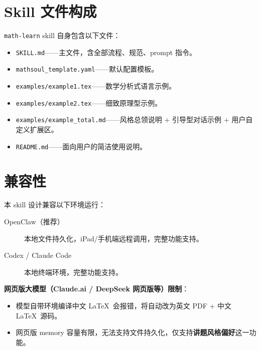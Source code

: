 \documentclass[12pt,a4paper]{ctexart}
\begin{document}
\section{Skill 文件构成}

\texttt{math-learn} skill 自身包含以下文件：
\begin{itemize}
  \item \texttt{SKILL.md}——主文件，含全部流程、规范、prompt 指令。
  \item \texttt{mathsoul\_template.yaml}——默认配置模板。
  \item \texttt{examples/example1.tex}——数学分析式语言示例。
  \item \texttt{examples/example2.tex}——细致原理型示例。
  \item \texttt{examples/example\_total.md}——风格总领说明 + 引导型对话示例 + 用户自定义扩展区。
  \item \texttt{README.md}——面向用户的简洁使用说明。
\end{itemize}

\section{兼容性}

本 skill 设计兼容以下环境运行：
\begin{description}
  \item[OpenClaw（推荐）] 本地文件持久化，iPad/手机端远程调用，完整功能支持。
  \item[Codex / Claude Code] 本地终端环境，完整功能支持。
\end{description}

\noindent\textbf{网页版大模型（Claude.ai / DeepSeek 网页版等）限制}：
\begin{itemize}
  \item 模型自带环境编译中文 \LaTeX\ 会报错，将自动改为英文 PDF + 中文 \LaTeX\ 源码。
  \item 网页版 memory 容量有限，无法支持文件持久化，仅支持\textbf{讲题风格偏好}这一功能。
\end{itemize}
\end{document}
